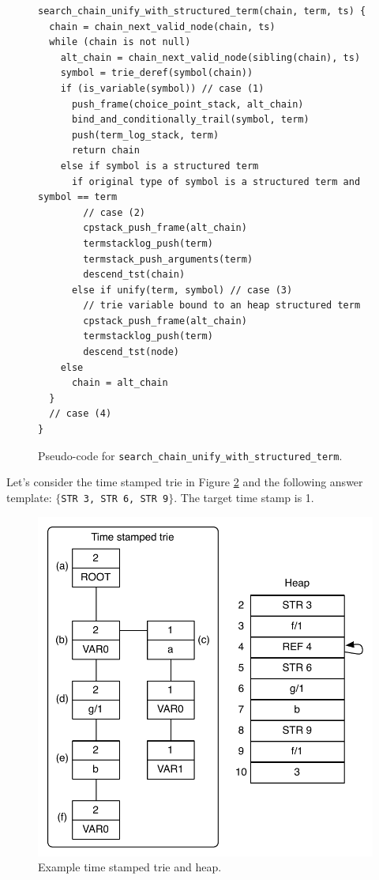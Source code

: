 \begin{figure}[ht]
\begin{Verbatim}
search_chain_unify_with_structured_term(chain, term, ts) {
  chain = chain_next_valid_node(chain, ts)
  while (chain is not null)
    alt_chain = chain_next_valid_node(sibling(chain), ts)
    symbol = trie_deref(symbol(chain))
    if (is_variable(symbol)) // case (1)
      push_frame(choice_point_stack, alt_chain)
      bind_and_conditionally_trail(symbol, term)
      push(term_log_stack, term)
      return chain
    else if symbol is a structured term
      if original type of symbol is a structured term and symbol == term
        // case (2)
        cpstack_push_frame(alt_chain)
        termstacklog_push(term)
        termstack_push_arguments(term)
        descend_tst(chain)
      else if unify(term, symbol) // case (3)
        // trie variable bound to an heap structured term
        cpstack_push_frame(alt_chain)
        termstacklog_push(term)
        descend_tst(node)
    else
      chain = alt_chain
  }
  // case (4)
}
\end{Verbatim}
\caption{Pseudo-code for \texttt{search\_chain\_unify\_with\_structured\_term}.}
\label{fig:search_chain_unify_with_structured_term}
\end{figure}

Let's consider the time stamped trie in Figure \ref{fig:collect_functor}
and the following answer template: $\{$\texttt{STR 3, STR 6, STR 9}$\}$.
The target time stamp is 1.

\begin{figure}[ht]
  \centering
    \includegraphics[scale=0.6]{collect_functor.pdf}
  \caption{Example time stamped trie and heap.}
  \label{fig:collect_functor}
\end{figure}

